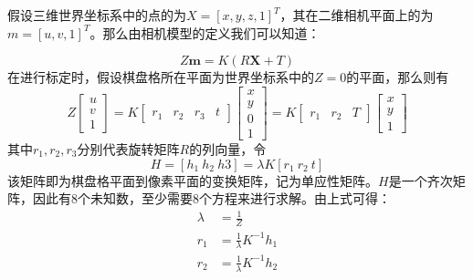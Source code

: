 假设三维世界坐标系中的点的\qczb 为\(X = [x,y,z,1]^T\)，其在二维相机平面上的\qczb 为\(m = [u,v,1]^T\)。那么由相机模型的定义我们可以知道：

\begin{equation}
    Z \bm{m} = K(R\bm{X} + T)
\end{equation}
在进行标定时，假设棋盘格所在平面为世界坐标系中的\(Z=0\)的平面，那么则有
\begin{equation}
    Z\left[ \begin{array}{c} u \\ v \\ 1 \end{array} \right] = K\left[
        \begin{array}{cccc} r_1 & r_2 & r_3 & t\end{array}
        \right]
    \left[
        \begin{array}{c}x \\y \\0 \\1\end{array}
        \right]=K
    \left[
        \begin{array}{cccc} r_1 & r_2 & T\end{array}
        \right]
    \left[
        \begin{array}{c}x \\y \\1\end{array}
        \right]
\end{equation}
其中\(r_1,r_2,r_3\)分别代表旋转矩阵\(R\)的列向量，令
\begin{equation}
    H=[h_1\ h_2\ h3] = \lambda K[r_1\ r_2\ t]
\end{equation}
该矩阵即为棋盘格平面到像素平面的变换矩阵，记为单应性矩阵。\(H\)是一个齐次矩阵，因此有8个未知数，至少需要8个方程来进行求解。由上式可得：
\begin{align}
    \lambda & = \frac{1}{Z}                 \\
    r_1     & = \frac{1}{\lambda} K^{-1}h_1 \\
    r_2     & = \frac{1}{\lambda} K^{-1}h_2
\end{align}

